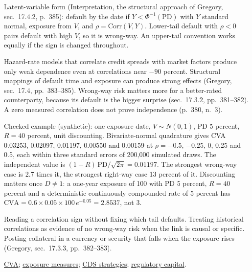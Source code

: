 \begin{qfdefinition}
 Latent-variable form (Interpretation, the structural approach of Gregory, sec.~17.4.2, p.~385): default by the date if $Y<\Phi^{-1}(\mathrm{PD})$ with $Y$ standard normal, exposure from $V$, and $\rho=\mathrm{Corr}(V,Y)$. Lower-tail default with $\rho<0$ pairs default with high $V$, so it is wrong-way. An upper-tail convention works equally if the sign is changed throughout.

 Hazard-rate models that correlate credit spreads with market factors produce only weak dependence even at correlations near $-90$ percent. Structural mappings of default time and exposure can produce strong effects (Gregory, sec.~17.4, pp.~383--385). Wrong-way risk matters more for a better-rated counterparty, because its default is the bigger surprise (sec.~17.3.2, pp.~381--382). A zero measured correlation does not prove independence (p.~380, n.~3).

 Checked example (synthetic): one exposure date, $V\sim N(0,1)$, PD 5 percent, $R=40$ percent, unit discounting. Bivariate-normal quadrature gives CVA 0.03253, 0.02097, 0.01197, 0.00550 and 0.00159 at $\rho=-0.5$, $-0.25$, 0, 0.25 and 0.5, each within three standard errors of 200{,}000 simulated draws. The independent value is $(1-R)\,\mathrm{PD}/\sqrt{2\pi}=0.01197$. The strongest wrong-way case is 2.7 times it, the strongest right-way case 13 percent of it. Discounting matters once $D\ne1$: a one-year exposure of 100 with PD 5 percent, $R=40$ percent and a deterministic continuously compounded rate of 5 percent has $\mathrm{CVA}=0.6\times0.05\times100\,e^{-0.05}=2.8537$, not 3.

 Reading a correlation sign without fixing which tail defaults. Treating historical correlations as evidence of no wrong-way risk when the link is causal or specific. Posting collateral in a currency or security that falls when the exposure rises (Gregory, sec.~17.3.3, pp.~382--383).

 \hyperref[meth:credit-valuation-adjustment]{CVA}; \hyperref[def:counterparty-exposure-measures]{exposure measures}; \hyperref[meth:cds-strategies]{CDS strategies}; \hyperref[rule:counterparty-credit-cva-capital]{regulatory capital}.

\end{qfdefinition}

